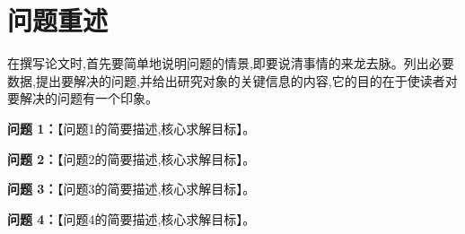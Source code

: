 
\section{问题重述}

在撰写论文时,首先要简单地说明问题的情景,即要说清事情的来龙去脉。列出必要数据,提出要解决的问题,并给出研究对象的关键信息的内容,它的目的在于使读者对要解决的问题有一个印象。


\textbf{问题 1：}【问题1的简要描述,核心求解目标】。

\textbf{问题 2：}【问题2的简要描述,核心求解目标】。

\textbf{问题 3：}【问题3的简要描述,核心求解目标】。

\textbf{问题 4：}【问题4的简要描述,核心求解目标】。
